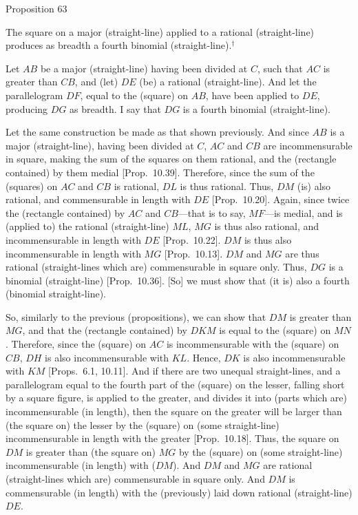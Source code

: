 
\begin{center}
{\large Proposition 63}
\end{center}

The square on a major (straight-line) applied
to a rational (straight-line)  produces as breadth a fourth binomial (straight-line).$^\dag$

\epsfysize=1.6in 
\centerline{}

Let $AB$ be a major (straight-line) having been divided at $C$, such that
$AC$ is greater than $CB$, and (let) $DE$ (be)  a rational (straight-line). And
let the parallelogram $DF$, equal to the (square) on $AB$, have been
applied to $DE$, producing $DG$ as breadth. I say that
$DG$ is a fourth binomial (straight-line).

Let the same construction be made as that shown previously.
And since $AB$ is a major (straight-line), having been divided at $C$, $AC$ and
$CB$ are incommensurable in square, making the sum of the squares
on them rational, and the (rectangle contained) by them medial [Prop.~10.39]. Therefore, since the sum of the
(squares) on $AC$ and $CB$ is rational, $DL$ is thus rational.
Thus, $DM$ (is) also rational, and commensurable in length with $DE$ [Prop.~10.20]. Again, since twice the (rectangle
contained) by $AC$ and $CB$---that is to say, $MF$---is medial,
and is (applied to) the rational (straight-line) $ML$,  $MG$
is thus also rational, and incommensurable in length with $DE$ [Prop.~10.22]. $DM$ is thus also incommensurable
in length with $MG$ [Prop.~10.13]. $DM$
and $MG$ are thus rational (straight-lines which are) commensurable
in square only. Thus, $DG$ is a binomial (straight-line) [Prop.~10.36]. [So] we must show that (it is)
also a fourth (binomial straight-line).

So, similarly to the previous (propositions), we can show that $DM$ is
greater than $MG$, and that the (rectangle contained) by $DKM$
is equal to the (square) on $MN$. Therefore, since the (square) on $AC$
is incommensurable with the (square) on $CB$, $DH$ is also incommensurable
with $KL$. Hence, $DK$ is also incommensurable with $KM$
[Props.~6.1, 10.11].
And if there are two unequal straight-lines, and a parallelogram
equal to the fourth part of the (square) on the lesser, falling short
by a square figure, is applied to the greater, and divides it
into (parts which are) incommensurable (in length), then the square on
the greater will be larger than (the square on) the lesser by the
(square) on (some straight-line) incommensurable in length
with the greater [Prop.~10.18]. Thus,
the square on $DM$ is greater than (the square on) $MG$ by the
(square) on (some straight-line) incommensurable (in length) with ($DM$). And
$DM$ and $MG$ are rational (straight-lines which are) commensurable
in square only. And $DM$ is commensurable (in length)
with the (previously) laid down rational (straight-line) $DE$.

